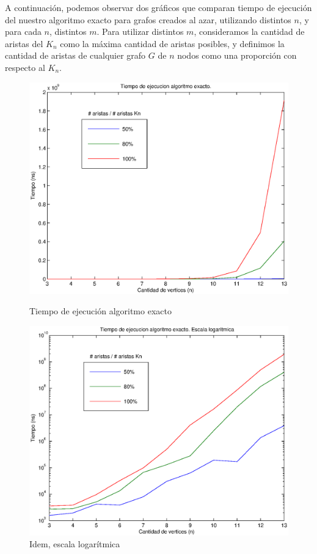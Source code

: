 A continuación, podemos observar dos gráficos que comparan tiempo de ejecución del nuestro algoritmo exacto para grafos creados al azar, utilizando distintos $n$, y para cada $n$, distintos $m$. Para utilizar distintos $m$, consideramos la cantidad de aristas del $K_n$ como la máxima cantidad de aristas posibles, y definimos la cantidad de aristas de cualquier grafo $G$ de $n$ nodos como una proporción con respecto al $K_n$.

\begin{figure}[H]
  \begin{minipage}{0.5\linewidth}
    \includegraphics[width=\linewidth]{graficos/exacto_tiempo.eps}
    \caption{Tiempo de ejecución algoritmo exacto}\label{fig:exacto-tiempo}
  \end{minipage}
  \hfill
  \begin{minipage}{0.5\linewidth}
    \includegraphics[width=\linewidth]{graficos/exacto_tiempo_log.eps}
    \caption{Idem, escala logarítmica}\label{fig:exacto-tiempo-log}
  \end{minipage}
\end{figure}

